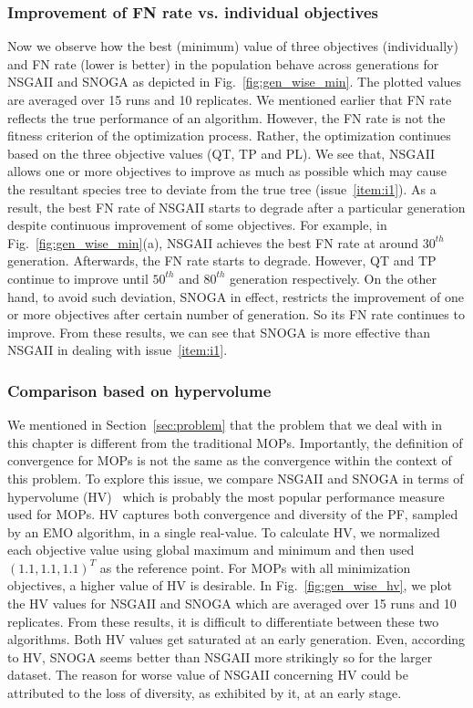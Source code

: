 \subsubsection{Improvement of FN rate vs. individual objectives} Now we observe how the best (minimum) value of three objectives (individually) and FN rate (lower is better) in the population behave across generations for NSGAII and SNOGA as depicted in Fig.~\ref{fig:gen_wise_min}. The plotted values are averaged over 15 runs and 10 replicates. We mentioned earlier that FN rate reflects the true performance of an algorithm. However, the FN rate is not the fitness criterion of the optimization process. Rather, the optimization continues based on the three objective values (QT, TP and PL).
We see that, NSGAII allows one or more objectives to improve as much as possible which may cause the resultant species tree to deviate from the true tree (issue~\ref{item:i1}). As a result, the best FN rate of NSGAII starts to degrade after a particular generation despite continuous improvement of some objectives. For example, in Fig.~\ref{fig:gen_wise_min}(a), NSGAII achieves the best FN rate at around $ 30^{th} $ generation. Afterwards, the FN rate starts to degrade. However, QT and TP continue to improve until $ 50^{th} $ and $ 80^{th} $ generation respectively.
On the other hand, to avoid such deviation, SNOGA in effect, restricts the improvement of one or more objectives after certain number of generation. So its FN rate continues to improve. From these results, we can see that SNOGA is more effective than NSGAII in dealing with issue~\ref{item:i1}.


\subsubsection{Comparison based on hypervolume} We mentioned in Section~\ref{sec:problem} that the problem that we deal with in this chapter is different from the traditional MOPs. Importantly, the definition of convergence for MOPs is not the same as the convergence within the context of this problem. To explore this issue, we compare NSGAII and SNOGA in terms of hypervolume (HV)~\cite{zitzler1999multiobjective} which is probably the most popular performance measure used for MOPs. HV captures both convergence and diversity of the PF, sampled by an EMO algorithm, in a single real-value. To calculate HV, we normalized each objective value using global maximum and minimum and then used $(1.1, 1.1, 1.1)^T$ as the reference point. For MOPs with all minimization objectives, a higher value of HV is desirable. In Fig.~\ref{fig:gen_wise_hv}, we plot the HV values for NSGAII and SNOGA which are averaged over 15 runs and 10 replicates. From these results, it is difficult to differentiate between these two algorithms. Both HV values get saturated at an early generation. Even, according to HV, SNOGA seems better than NSGAII more strikingly so for the larger dataset. The reason for worse value of NSGAII concerning HV could be attributed to the loss of diversity, as exhibited by it, at an early stage. 

